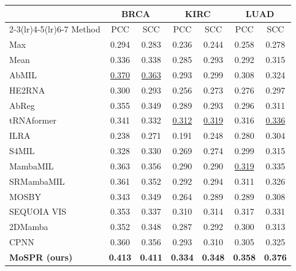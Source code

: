 \begin{tabular}{lcccccc}
\toprule
& \multicolumn{2}{c}{BRCA} & \multicolumn{2}{c}{KIRC} & \multicolumn{2}{c}{LUAD}\\
\cmidrule(lr){2-3}\cmidrule(lr){4-5}\cmidrule(lr){6-7}
Method & PCC & SCC & PCC & SCC & PCC & SCC\\
\midrule
Max~\citep{wang2018revisiting} & 0.294 & 0.283 & 0.236 & 0.244 & 0.258 & 0.278\\
Mean~\citep{wang2018revisiting} & 0.336 & 0.338 & 0.285 & 0.293 & 0.292 & 0.315\\
AbMIL~\citep{ilse2018abmil} & \underline{0.370} & \underline{0.363} & 0.293 & 0.299 & 0.308 & 0.324\\
HE2RNA~\citep{schmauch2020he2rna} & 0.300 & 0.293 & 0.256 & 0.273 & 0.276 & 0.297\\
AbReg~\citep{graziani2022abreg} & 0.355 & 0.349 & 0.289 & 0.293 & 0.296 & 0.311\\
tRNAformer~\citep{alsaafin2022trnaformer} & 0.341 & 0.332 & \underline{0.312} & \underline{0.319} & 0.316 & \underline{0.336}\\
ILRA~\citep{xiang2023ilra} & 0.238 & 0.271 & 0.191 & 0.248 & 0.280 & 0.304\\
S4MIL~\citep{fillioux2023s4mil} & 0.328 & 0.330 & 0.269 & 0.274 & 0.299 & 0.315\\
MambaMIL~\citep{yang2024mambamil} & 0.363 & 0.356 & 0.290 & 0.290 & \underline{0.319} & 0.335\\
SRMambaMIL~\citep{yang2024mambamil} & 0.361 & 0.352 & 0.292 & 0.294 & 0.311 & 0.326\\
MOSBY~\citep{senbabaoglu2024mosby} & 0.343 & 0.349 & 0.264 & 0.289 & 0.289 & 0.308\\
SEQUOIA VIS~\citep{pizurica2024sequoia} & 0.353 & 0.337 & 0.310 & 0.314 & 0.317 & 0.331\\
2DMamba~\citep{zhang2025twodmamba} & 0.352 & 0.348 & 0.287 & 0.292 & 0.300 & 0.313\\
CPNN~\citep{nishimura2026cpnn} & 0.360 & 0.356 & 0.293 & 0.310 & 0.305 & 0.325\\
\midrule
\textbf{MoSPR (ours)} & \textbf{0.413} & \textbf{0.411} & \textbf{0.334} & \textbf{0.348} & \textbf{0.358} & \textbf{0.376}\\
\bottomrule
\end{tabular}